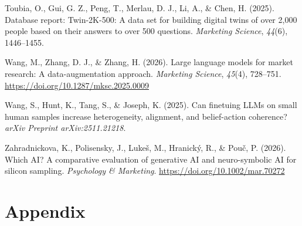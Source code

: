 \documentclass[
  11pt,
  letterpaper,
]{article}
\newlength{\cslhangindent}
\newenvironment{CSLReferences}[2] %
 {\begin{list}{}{%
  \setlength{\itemindent}{0pt}
  \setlength{\leftmargin}{0pt}
  \setlength{\parsep}{0pt}
  \ifodd #1
   \setlength{\leftmargin}{\cslhangindent}
   \setlength{\itemindent}{-1\cslhangindent}
  \fi
  \setlength{\itemsep}{#2\baselineskip}}}
 {\end{list}}
\begin{document}
\begin{CSLReferences}{1}{0}
Toubia, O., Gui, G. Z., Peng, T., Merlau, D. J., Li, A., \& Chen, H.
(2025). Database report: {Twin-2K-500}: A data set for building digital
twins of over 2,000 people based on their answers to over 500 questions.
\emph{Marketing Science}, \emph{44}(6), 1446--1455.

Wang, M., Zhang, D. J., \& Zhang, H. (2026). Large language models for
market research: A data-augmentation approach. \emph{Marketing Science},
\emph{45}(4), 728--751. \url{https://doi.org/10.1287/mksc.2025.0009}

Wang, S., Hunt, K., Tang, S., \& Joseph, K. (2025). Can finetuing LLMs
on small human samples increase heterogeneity, alignment, and
belief-action coherence? \emph{arXiv Preprint arXiv:2511.21218}.

Zahradnickova, K., Polisensky, J., Lukeš, M., Hranický, R., \& Pouč, P.
(2026). Which AI? A comparative evaluation of generative AI and
neuro-symbolic AI for silicon sampling. \emph{Psychology \& Marketing}.
\url{https://doi.org/10.1002/mar.70272}

\end{CSLReferences}

\newpage{}

\section*{Appendix}\label{appendix}
\end{document}
